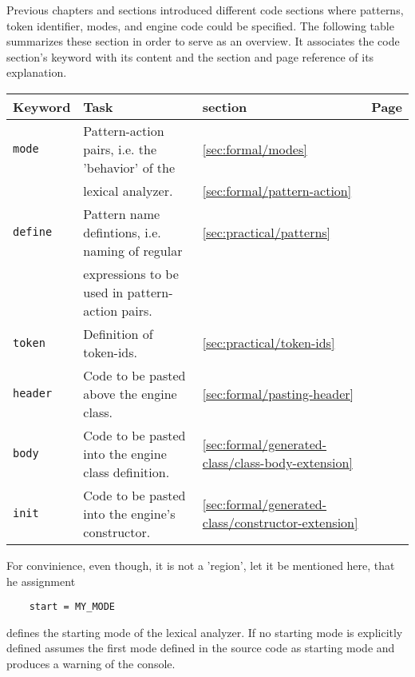 Previous chapters and sections introduced different code sections where
patterns, token identifier, modes, and engine code could be specified. The
following table summarizes these section in order to serve as an overview. It
associates the code section's keyword with its content and the section and page
reference of its explanation.
\vskip0.5cm
\begin{tabular}{|l|l|l|l|} \hline
{\bf Keyword} & {\bf Task}                                     & {\bf section} & {\bf Page} \\ \hline \hline
{\tt mode}  & Pattern-action pairs, i.e. the 'behavior' of the & \ref{sec:formal/modes} 
                                                               & \pageref{sec:formal/modes}  \\
	    & lexical analyzer.                                & \ref{sec:formal/pattern-action} 
     	                                                       & \pageref{sec:formal/pattern-action} \\ \hline
{\tt define}  & Pattern name defintions, i.e. naming of regular & \ref{sec:practical/patterns}  
                                                                & \pageref{sec:practical/patterns}  \\
	      & expressions to be used in pattern-action pairs. &         &             \\ \hline
{\tt token}   & Definition of token-ids.                       
                                             & \ref{sec:practical/token-ids}  
                                             & \pageref{sec:practical/token-ids}  \\ \hline
{\tt header}  & Code to be pasted above the engine class.      
                                             & \ref{sec:formal/pasting-header}  
				             & \pageref{sec:formal/pasting-header}  \\ \hline
{\tt body}    & Code to be pasted into the engine class definition. 
                                             & \ref{sec:formal/generated-class/class-body-extension}  
                                             & \pageref{sec:formal/generated-class/class-body-extension} \\ \hline
{\tt init}    & Code to be pasted into the engine's constructor.    
                                             & \ref{sec:formal/generated-class/constructor-extension}  
					     & \pageref{sec:formal/generated-class/constructor-extension} \\ \hline
\end{tabular}
\vskip0.5cm
For convinience, even though, it is not a 'region', let it be mentioned here, that he 
assignment 
\begin{lstlisting}
    start = MY_MODE
\end{lstlisting}
defines the starting mode of the lexical analyzer. If no starting mode is explicitly defined
{\quex} assumes the first mode defined in the source code as starting mode and produces a 
warning of the console.
